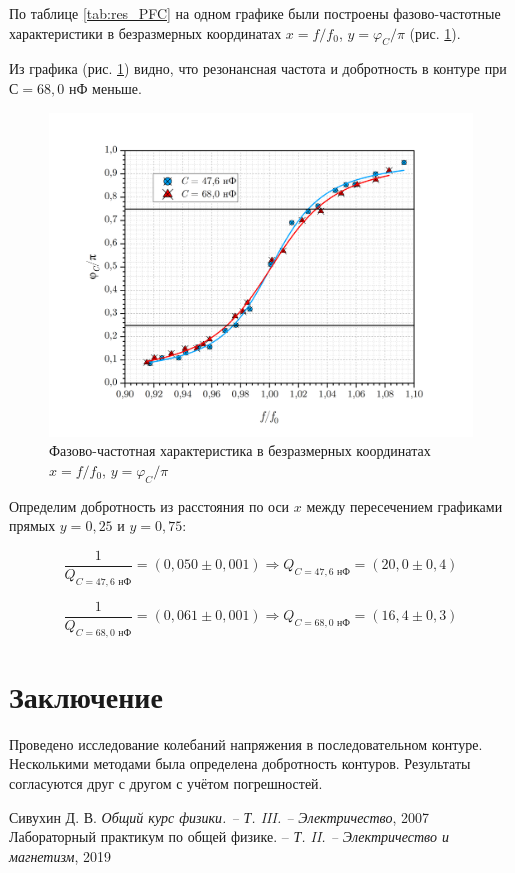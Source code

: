\documentclass[a4paper, 12pt]{article}
\begin{document}
     По таблице \ref{tab:res_PFC} на одном графике были построены фазово-частотные характеристики в безразмерных координатах $x = f/f_0$, $y = \varphi_C/\pi$ (рис. \ref{graph_PFC_unit}).

    Из графика (рис. \ref{graph_PFC_unit}) видно, что резонансная частота и добротность в контуре при $С = 68,0$ нФ меньше.

    \begin{figure}[H]
        \centering
        \includegraphics[width = 14cm]{images/graph_PFC_unit.png}
        \caption{Фазово-частотная характеристика в безразмерных координатах $x = f/f_0$, $y = \varphi_C/\pi$}
        \label{graph_PFC_unit}
    \end{figure}
    
    Определим добротность из расстояния по оси $x$ между пересечением графиками прямых $y = 0,25$ и $y = 0,75$:
    
    \begin{equation}
    	\frac{1}{Q_{C=47,6 \text{ нФ}}} = \left(0,050 \pm 0,001 \right) \Rightarrow Q_{C=47,6 \text{ нФ}} = \left(20,0 \pm 0,4 \right)
    \end{equation}
    
    \begin{equation}
    	\frac{1}{Q_{C=68,0 \text{ нФ}}} = \left(0,061 \pm 0,001 \right) \Rightarrow Q_{C=68,0 \text{ нФ}} = \left(16,4 \pm 0,3 \right)
    \end{equation}
    
    \section{Заключение}

    Проведено исследование колебаний напряжения в последовательном контуре. Несколькими методами была определена добротность контуров. Результаты согласуются друг с другом с учётом погрешностей.

    \begin{thebibliography}{9}
         Сивухин Д. В. \emph{Общий курс физики. -- Т. III. -- Электричество}, 2007
         Лабораторный практикум по общей физике. -- \emph{Т. II. -- Электричество и магнетизм}, 2019
    \end{thebibliography}
\end{document}
